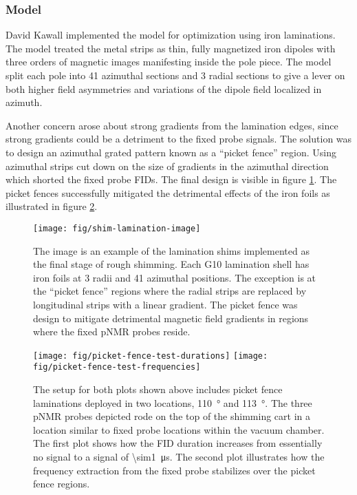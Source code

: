 \subsubsection{Model}

David Kawall implemented the model for optimization using iron laminations.  The model treated the metal strips as thin, fully magnetized iron dipoles with three orders of magnetic images manifesting inside the pole piece.  The model split each pole into 41 azimuthal sections and 3 radial sections to give a lever on both higher field asymmetries and variations of the dipole field localized in azimuth.  

Another concern arose about strong gradients from the lamination edges, since strong gradients could be a detriment to the fixed probe signals.  The solution was to design an azimuthal grated pattern known as a ``picket fence'' region.  Using azimuthal strips cut down on the size of gradients in the azimuthal direction which shorted the fixed probe FIDs. The final design is visible in figure \ref{fig:shim-lamination-image}.  The picket fences successfully mitigated the detrimental effects of the iron foils as illustrated in figure \ref{fig:picket-fence-test}.


\begin{figure}
\centering
\texttt{[image: fig/shim-lamination-image]}
\caption{
    The image is an example of the lamination shims implemented as the final stage of rough shimming.  Each G10 lamination shell has iron foils at 3 radii and 41 azimuthal positions.  The exception is at the ``picket fence'' regions where the radial strips are replaced by longitudinal strips with a linear gradient.  The picket fence was design to mitigate detrimental magnetic field gradients in regions where the fixed pNMR probes reside.
    \label{fig:shim-lamination-image}
}
\end{figure}

\begin{figure}
\centering
\texttt{[image: fig/picket-fence-test-durations]}
\texttt{[image: fig/picket-fence-test-frequencies]}
\caption{
    The setup for both plots shown above includes picket fence laminations deployed in two locations, \SI{110}{\degree} and \SI{113}{\degree}.  The three pNMR probes depicted rode on the top of the shimming cart in a location similar to fixed probe locations within the vacuum chamber.  The first plot shows how the FID duration increases from essentially no signal to a signal of \SI{\sim1}{\micro \second}.  The second plot illustrates how the frequency extraction from the fixed probe stabilizes over the picket fence regions.
    \label{fig:picket-fence-test}
}
\end{figure}

